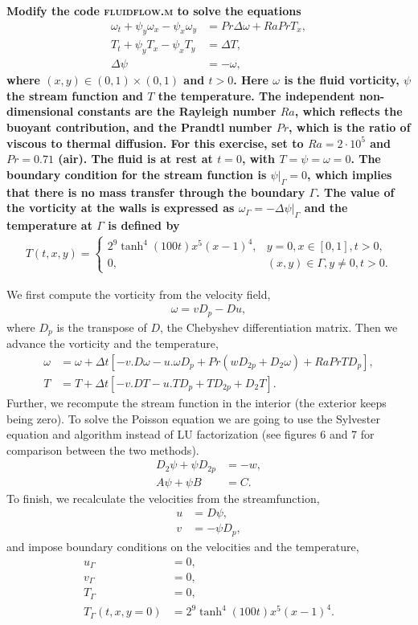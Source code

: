 \textbf{Modify the code \textsc{fluidflow.m} to solve the equations 
\begin{align*}
\omega_t+\psi_y\omega_x-\psi_x\omega_y &= Pr\Delta\omega+RaPrT_x,\\
T_t+\psi_yT_x-\psi_xT_y &= \Delta T,\\
\Delta\psi &= -\omega,
\end{align*}
where $(x,y)\in (0,1)\times (0,1)$ and $t>0$. Here $\omega$ is the fluid vorticity, $\psi$ the stream function and $T$ the temperature. The independent non-dimensional constants are the Rayleigh number $Ra$, which reflects the buoyant contribution, and the Prandtl number $Pr$, which is the ratio of viscous to thermal diffusion. For this exercise, set to $Ra = 2\cdot 10^5$ and $Pr=0.71$ (air). The fluid is at rest at $t= 0$, with $T=\psi=\omega= 0$. The boundary condition for the stream function is $\left.\psi\right|_{\Gamma}=0$, which implies that there is no mass transfer through the boundary $\Gamma$. The value of the vorticity at the walls is expressed as $\omega_{\Gamma}=-\left.\Delta\psi\right|_{\Gamma}$ and the temperature at $\Gamma$ is defined by
\begin{align*}
T(t,x,y) = 
\begin{cases}
       2^9\tanh^4(100t)x^5(x-1)^4,&  y=0, x\in [0,1], t>0,\\
       0,& (x,y)\in\Gamma, y\neq 0, t>0.
\end{cases}
\end{align*}
}
\newline

We first compute the vorticity from the velocity field,
\begin{align*}
\omega = vD_p-Du,
\end{align*}
where $D_p$ is the transpose of $D$, the Chebyshev differentiation matrix. Then we advance the vorticity and the temperature,
\begin{align*}
\omega &= \omega + \Delta t\left[-v.D\omega-u.\omega D_p+Pr\left(wD_{2p}+D_2\omega\right)+RaPrTD_p\right],\\
T &= T + \Delta t\left[-v.DT-u.TD_p+TD_{2p}+D_2T\right].
\end{align*}
Further, we recompute the stream function in the interior (the exterior keeps being zero). To solve the Poisson equation we are going to use the Sylvester equation and algorithm instead of LU factorization (see figures 6 and 7 for comparison between the two methods).
\begin{align*}
D_2\psi+\psi D_{2p}&=-w,\\
A\psi+\psi B &= C.
\end{align*}
To finish, we recalculate the velocities from the streamfunction,
\begin{align*}
u &= D\psi,\\
v &= -\psi D_{p},
\end{align*}
and impose boundary conditions on the velocities and the temperature,
\begin{align*}
u_{\Gamma}&=0,\\
v_{\Gamma}&=0,\\
T_{\Gamma}&=0,\\
T_{\Gamma}(t,x,y= 0)&=2^9\tanh^4(100t)x^5(x-1)^4.
\end{align*}

